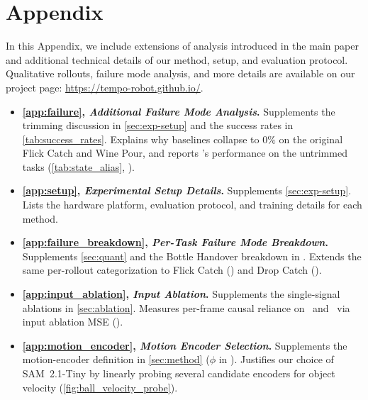\newpage
\appendix

\setcounter{figure}{0}
\setcounter{table}{0}
\renewcommand{\thefigure}{A\arabic{figure}}
\renewcommand{\thetable}{A\arabic{table}}

\section*{Appendix}

In this Appendix, we include extensions of analysis introduced in the main paper and additional technical details of our method, setup, and evaluation protocol. Qualitative rollouts, failure mode analysis, and more details are available on our project page: \url{https://tempo-robot.github.io/}.
\begin{itemize}
	\item \textbf{\cref{app:failure}, \emph{Additional Failure Mode Analysis}.} Supplements the trimming discussion in \cref{sec:exp-setup} and the success rates in \cref{tab:success_rates}. Explains why baselines collapse to $0\%$ on the original Flick Catch and Wine Pour, and reports \ours's performance on the untrimmed tasks (\cref{tab:state_alias}, ).
	\item \textbf{\cref{app:setup}, \emph{Experimental Setup Details}.} Supplements \cref{sec:exp-setup}. Lists the hardware platform, evaluation protocol, and training details for each method.
	\item \textbf{\cref{app:failure_breakdown}, \emph{Per-Task Failure Mode Breakdown}.} Supplements \cref{sec:quant} and the Bottle Handover breakdown in . Extends the same per-rollout categorization to Flick Catch () and Drop Catch ().
	\item \textbf{\cref{app:input_ablation}, \emph{Input Ablation}.} Supplements the single-signal ablations in \cref{sec:ablation}. Measures per-frame causal reliance on \TEMPOMOT\ and \TEMPOACT\ via input ablation MSE ().
	\item \textbf{\cref{app:motion_encoder}, \emph{Motion Encoder Selection}.} Supplements the motion-encoder definition in \cref{sec:method} ($\phi$ in \TEMPOMOT). Justifies our choice of SAM~2.1-Tiny by linearly probing several candidate encoders for object velocity (\cref{fig:ball_velocity_probe}).
\end{itemize}


